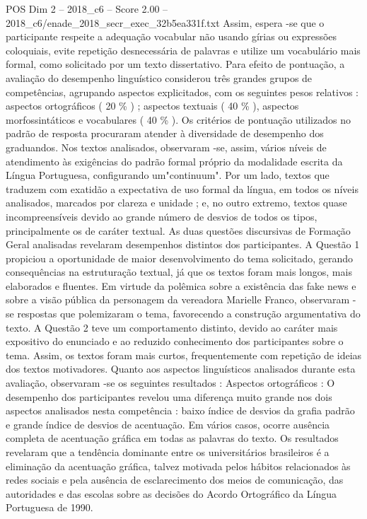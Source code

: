 \begin{textsample}{POS Dim 2 – 2018\_c6 – Score 2.00 – 2018\_c6/enade\_2018\_secr\_exec\_32b5ea331f.txt}
Assim, espera -se que o participante respeite a adequação vocabular não usando gírias ou expressões coloquiais, evite repetição desnecessária de palavras e utilize um vocabulário mais formal, como solicitado por um texto dissertativo.
Para efeito de pontuação, a avaliação do desempenho linguístico considerou três grandes grupos de competências, agrupando aspectos explicitados, com os seguintes pesos relativos : aspectos ortográficos ( 20 \% ) ; aspectos textuais ( 40 \% ), aspectos morfossintáticos e vocabulares ( 40 \% ).
Os critérios de pontuação utilizados no padrão de resposta procuraram atender à diversidade de desempenho dos graduandos.
Nos textos analisados, observaram -se, assim, vários níveis de atendimento às exigências do padrão formal próprio da modalidade escrita da Língua Portuguesa, configurando um"continuum".
Por um lado, textos que traduzem com exatidão a expectativa de uso formal da língua, em todos os níveis analisados, marcados por clareza e unidade ; e, no outro extremo, textos quase incompreensíveis devido ao grande número de desvios de todos os tipos, principalmente os de caráter textual.
As duas questões discursivas de Formação Geral analisadas revelaram desempenhos distintos dos participantes.
A Questão 1 propiciou a oportunidade de maior desenvolvimento do tema solicitado, gerando consequências na estruturação textual, já que os textos foram mais longos, mais elaborados e fluentes.
Em virtude da polêmica sobre a existência das fake news e sobre a visão pública da personagem da vereadora Marielle Franco, observaram -se respostas que polemizaram o tema, favorecendo a construção argumentativa do texto.
A Questão 2 teve um comportamento distinto, devido ao caráter mais expositivo do enunciado e ao reduzido conhecimento dos participantes sobre o tema.
Assim, os textos foram mais curtos, frequentemente com repetição de ideias dos textos motivadores.
Quanto aos aspectos linguísticos analisados durante esta avaliação, observaram -se os seguintes resultados : Aspectos ortográficos : O desempenho dos participantes revelou uma diferença muito grande nos dois aspectos analisados nesta competência : baixo índice de desvios da grafia padrão e grande índice de desvios de acentuação.
Em vários casos, ocorre ausência completa de acentuação gráfica em todas as palavras do texto.
Os resultados revelaram que a tendência dominante entre os universitários brasileiros é a eliminação da acentuação gráfica, talvez motivada pelos hábitos relacionados às redes sociais e pela ausência de esclarecimento dos meios de comunicação, das autoridades e das escolas sobre as decisões do Acordo Ortográfico da Língua Portuguesa de 1990.

\end{textsample}
